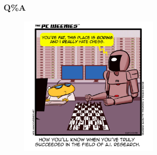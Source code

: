 \documentclass{beamer}
\begin{document}
\begin{frame}
  \frametitle{Q\%A}
  
  \begin{figure}
    \includegraphics[width=0.6\textwidth]{ai_jokes.jpg}
  \end{figure}
\end{frame}
\end{document}
